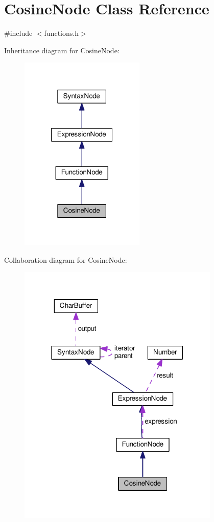 \hypertarget{classCosineNode}{}\section{Cosine\+Node Class Reference}
\label{classCosineNode}


{\ttfamily \#include $<$functions.\+h$>$}



Inheritance diagram for Cosine\+Node\+:\nopagebreak
\begin{figure}[H]
\begin{center}
\leavevmode
\includegraphics[width=169pt]{classCosineNode__inherit__graph}
\end{center}
\end{figure}


Collaboration diagram for Cosine\+Node\+:\nopagebreak
\begin{figure}[H]
\begin{center}
\leavevmode
\includegraphics[width=272pt]{classCosineNode__coll__graph}
\end{center}
\end{figure}
